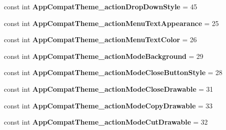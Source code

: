 \begin{DoxyCompactItemize}
const int {\bfseries App\+Compat\+Theme\+\_\+action\+Drop\+Down\+Style} = 45
\item 
\mbox{\label{class_pinned_app_1_1_droid_1_1_resource_1_1_styleable_a46068ef20d54730c0d872aa2b7b29dd1}} 
const int {\bfseries App\+Compat\+Theme\+\_\+action\+Menu\+Text\+Appearance} = 25
\item 
\mbox{\label{class_pinned_app_1_1_droid_1_1_resource_1_1_styleable_abb0cd1763e19f678e04994438194bf0d}} 
const int {\bfseries App\+Compat\+Theme\+\_\+action\+Menu\+Text\+Color} = 26
\item 
\mbox{\label{class_pinned_app_1_1_droid_1_1_resource_1_1_styleable_afba1e576fa10842382bdd07b39e52a1b}} 
const int {\bfseries App\+Compat\+Theme\+\_\+action\+Mode\+Background} = 29
\item 
\mbox{\label{class_pinned_app_1_1_droid_1_1_resource_1_1_styleable_a99bbc08d5e6e77186f7c9d9e46131a98}} 
const int {\bfseries App\+Compat\+Theme\+\_\+action\+Mode\+Close\+Button\+Style} = 28
\item 
\mbox{\label{class_pinned_app_1_1_droid_1_1_resource_1_1_styleable_a34971358384d4b7e04b33c286f9f92c0}} 
const int {\bfseries App\+Compat\+Theme\+\_\+action\+Mode\+Close\+Drawable} = 31
\item 
\mbox{\label{class_pinned_app_1_1_droid_1_1_resource_1_1_styleable_aa9cf01c49bf5d00e9c7d6159bae1e31e}} 
const int {\bfseries App\+Compat\+Theme\+\_\+action\+Mode\+Copy\+Drawable} = 33
\item 
\mbox{\label{class_pinned_app_1_1_droid_1_1_resource_1_1_styleable_ae18d48d4399d50ea0a529b8d2c302005}} 
const int {\bfseries App\+Compat\+Theme\+\_\+action\+Mode\+Cut\+Drawable} = 32
\item 
\mbox{\label{class_pinned_app_1_1_droid_1_1_resource_1_1_styleable_ae6e7de4ef75b0a7aeda3a5f7863fde3e}} 

\end{DoxyCompactItemize}
